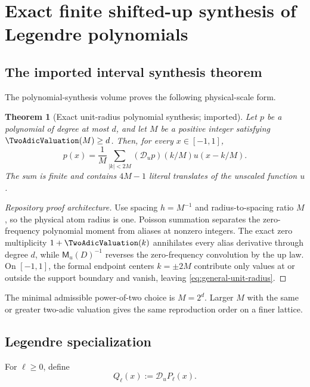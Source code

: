 \documentclass[11pt,oneside]{article}
\numberwithin{equation}{section}
\newtheorem{theorem}{Theorem}[section]
\theoremstyle{definition}
\theoremstyle{remark}
\newcommand{\MM}{\mathsf M}
\newcommand{\Dscr}{\mathscr D_u}
\begin{document}
\section{Exact finite shifted-up synthesis of Legendre polynomials}
\label{sec:legendre-synthesis}

\subsection{The imported interval synthesis theorem}

The polynomial-synthesis volume proves the following physical-scale form.

\begin{theorem}[Exact unit-radius polynomial synthesis; imported]
\label{thm:general-synthesis}
Let $p$ be a polynomial of degree at most $d$, and let $M$ be a positive
integer satisfying $\TwoAdicValuation(M)\ge d$.  Then, for every $x\in[-1,1]$,
\begin{equation}
 p(x)=\frac1M\sum_{|k|<2M}(\Dscr p)(k/M)u(x-k/M).
 \label{eq:general-unit-radius}
\end{equation}
The sum is finite and contains $4M-1$ literal translates of the unscaled
function $u$.
\end{theorem}

\begin{proof}[Repository proof architecture]
Use spacing $h=M^{-1}$ and radius-to-spacing ratio $M$, so the physical atom
radius is one.  Poisson summation separates the zero-frequency polynomial
moment from aliases at nonzero integers.  The exact zero multiplicity
$1+\TwoAdicValuation(k)$ annihilates every alias derivative through degree $d$, while
$\MM_u(D)^{-1}$ reverses the zero-frequency convolution by the up law.  On
$[-1,1]$, the formal endpoint centers $k=\pm2M$ contribute only values at or
outside the support boundary and vanish, leaving \eqref{eq:general-unit-radius}.
\end{proof}

The minimal admissible power-of-two choice is $M=2^d$.  Larger $M$ with the
same or greater two-adic valuation gives the same reproduction order on a
finer lattice.

\subsection{Legendre specialization}

\begin{definition}
\label{def:Q}
For $\ell\ge0$, define
\begin{equation}
 Q_\ell(x):=\Dscr P_\ell(x).
 \label{eq:Q-def}
\end{equation}
\end{definition}
\end{document}
